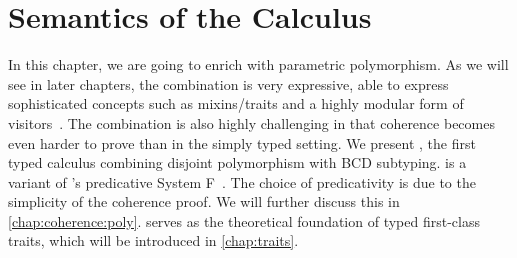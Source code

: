 
\chapter{Semantics of the \fnamee Calculus}
\label{chap:fi}

In this chapter, we are going to enrich \namee with parametric polymorphism. As
we will see in later chapters, the combination is very expressive, able to express sophisticated
concepts such as mixins/traits and a highly modular form of visitors~\citep{oliveira09modular, togersen:2004}. The
combination is also highly challenging in that coherence becomes even harder to
prove than in the simply typed setting. We present \fnamee, the first typed
calculus combining disjoint polymorphism with BCD subtyping. \fnamee is a
variant of \citeauthor{leivant1991finitely}'s predicative System
F~\citep{leivant1991finitely}. The choice of predicativity is due to the
simplicity of the coherence proof. We will further discuss this in
\cref{chap:coherence:poly}. \fnamee serves as the theoretical foundation of
typed first-class traits, which will be introduced in \cref{chap:traits}.












